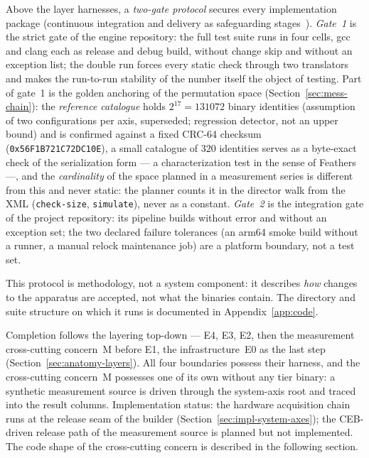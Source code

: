 \begin{nurkurz}
Above the layer harnesses, a \emph{two-gate protocol} secures every implementation package (continuous
integration and delivery as safeguarding stages~\cite{fowler2006ci,humble2010cd}).
\emph{Gate~1} is
the strict gate of the engine repository: the full test suite runs in four cells, gcc and clang each as
release and debug build, without change skip and without an exception list; the double run forces every
static check through two translators and makes the run-to-run stability of the number itself the
object of testing. Part of gate~1 is the golden anchoring of the permutation space
(Section~\ref{sec:mess-chain}): the \emph{reference catalogue} holds $2^{17} = 131072$ binary
identities (assumption of two configurations per axis, superseded; regression detector, not an upper bound)
and is confirmed against a fixed CRC-64 checksum (\texttt{0x56F1B721C72DC10E}), a %
small catalogue of $320$ identities serves as a byte-exact check of the serialization form --- a
characterization test in the sense of Feathers~\cite{feathers2004legacy} ---, and the
\emph{cardinality} of the space planned in a measurement series is different from this and never
static: the planner counts it in the director walk from the XML (\texttt{check-size},
\texttt{simulate}), never as a constant.
\emph{Gate~2} is the integration gate of the project
repository: its pipeline builds without error and without an exception set; the two declared failure
tolerances (an arm64 smoke build without a runner, a manual relock maintenance job) are a platform
boundary, not a test set.

This protocol is methodology, not a system component: it describes \emph{how} changes to the apparatus
are accepted, not what the binaries contain. The directory and suite structure on which it runs is
documented in Appendix~\ref{app:code}.

Completion follows the layering top-down --- E4, E3, E2, then the measurement cross-cutting concern~M
before E1, the infrastructure~E0 as the last step (Section~\ref{sec:anatomy-layers}). All four
boundaries possess their harness, and the cross-cutting concern~M possesses one of its own without any
tier binary: a synthetic measurement source is driven through the system-axis root and traced into the
result columns. Implementation status: the hardware acquisition chain runs at the release seam of the
builder (Section~\ref{sec:impl-system-axes}); the CEB-driven release path of the measurement source is
planned but not implemented. The code shape of the cross-cutting concern is described in the following
section.
\end{nurkurz}

